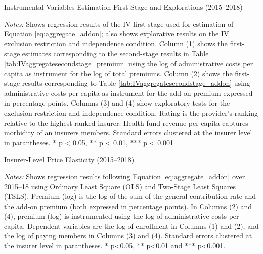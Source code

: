 \documentclass[a4paper, 11pt, english]{article}
\begin{document}
\begin{table}
	\caption{Instrumental Variables Estimation First Stage and Explorations (2015--2018)}
	\label{tab:IVaggregatefirststage}
	
	\begin{minipage}{\textwidth}
		\vspace{3pt} 
		\footnotesize \textit{Notes:} Shows regression results of the IV first-stage used for estimation of Equation \eqref{eq:aggregate_addon}; also shows explorative results on the IV exclusion restriction and independence condition.
		Column (1) shows the first-stage estimates corresponding to the second-stage results in Table \ref{tab:IVaggregatesecondstage_premium} using the log of administrative costs per capita as instrument for the log of total premiums. Column (2) shows the first-stage results corresponding to Table \ref{tab:IVaggregatesecondstage_addon} using administrative costs per capita as instrument for the add-on premium expressed in percentage points. Columns (3) and (4) show exploratory tests for the exclusion restriction and independence condition. 
		Rating is the provider's ranking relative to the highest ranked insurer. Health fund revenue per capita captures morbidity of an insurers members. 
		Standard errors clustered at the insurer level in parantheses. * p < 0.05, ** p < 0.01, *** p < 0.001 
	\end{minipage}	
\end{table}

\begin{table}
	\caption{Insurer-Level Price Elasticity (2015--2018)}
	\label{tab:IVaggregatesecondstage_premium}
	
	\begin{minipage}{\textwidth}
		\vspace{3pt} 
		\footnotesize \textit{Notes:} Shows regression results following Equation \eqref{eq:aggregate_addon} over 2015--18 using Ordinary Least Square (OLS) and Two-Stage Least Squares (TSLS). 
		Premium (log) is the log of the sum of the general contribution rate and the add-on premium (both expressed in percentage points). 
		In Columns (2) and (4), premium (log) is instrumented using the log of administrative costs per capita.
		Dependent variables are the log of enrollment in Columns (1) and (2), and the log of paying members in Columns (3) and (4). 
		Standard errors clustered at the insurer level in parantheses. * p<0.05, **  p<0.01 and *** p<0.001. 
	\end{minipage}	
\end{table}
\end{document}
